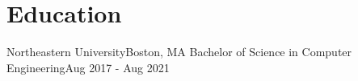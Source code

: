 \section{Education}
\resumeSubHeadingListStart
\resumeSubheading
{Northeastern University}{Boston, MA}
{Bachelor of Science in Computer Engineering}{Aug 2017 - Aug 2021}
\resumeSubHeadingListEnd
